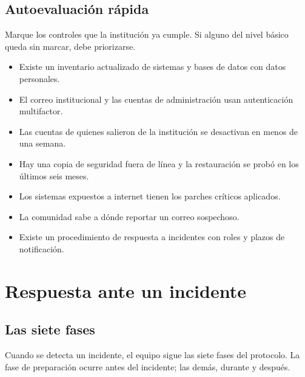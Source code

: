 \documentclass[11pt,a4paper,oneside]{report}
\newcommand{\casilla}{$\square$}
\begin{document}
\section{Autoevaluación rápida}
Marque los controles que la institución ya cumple. Si alguno del nivel básico queda sin marcar, debe priorizarse.

\begin{itemize}[leftmargin=*]
  \item[\casilla] Existe un inventario actualizado de sistemas y bases de datos con datos personales.
  \item[\casilla] El correo institucional y las cuentas de administración usan autenticación multifactor.
  \item[\casilla] Las cuentas de quienes salieron de la institución se desactivan en menos de una semana.
  \item[\casilla] Hay una copia de seguridad fuera de línea y la restauración se probó en los últimos seis meses.
  \item[\casilla] Los sistemas expuestos a internet tienen los parches críticos aplicados.
  \item[\casilla] La comunidad sabe a dónde reportar un correo sospechoso.
  \item[\casilla] Existe un procedimiento de respuesta a incidentes con roles y plazos de notificación.
\end{itemize}

\chapter{Respuesta ante un incidente}
\label{cap:respuesta}
\section{Las siete fases}
Cuando se detecta un incidente, el equipo sigue las siete fases del protocolo. La fase de preparación ocurre antes del incidente; las demás, durante y después.
\end{document}
